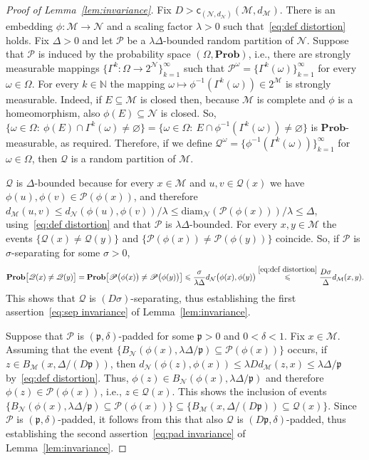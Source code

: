 \documentclass[11pt,reqno]{amsart}
\renewcommand{\le}{\leqslant}
\newcommand{\diam}{\mathrm{diam}}
\renewcommand{\d}{\delta}
\newcommand{\cc}{\mathsf{c}}
\newcommand{\NN}{\mathcal{N}}
\theoremstyle{remark}
\newcommand{\MM}{\mathcal{M}}
\renewcommand{\subset}{\subseteq}
\newcommand{\N}{\mathbb N}
\renewcommand{\Pr}{\mathbf{Prob}}
\renewcommand{\emptyset}{\varnothing}
\renewcommand{\1}{\mathbf 1}
\newcommand{\Part}{\mathscr{P}}
\begin{document}
\begin{proof}[Proof of Lemma~\ref{lem:invariance}]
Fix $D>\cc_{(\NN,d_\NN)}(\MM,d_\MM)$. There is an embedding $\phi:\MM\to \NN$ and a scaling factor $\lambda>0$ such that~\eqref{eq:def distortion} holds.  Fix $\Delta>0$ and let $\Part$ be a $\lambda\Delta$-bounded random partition of $\NN$. Suppose that $\Part$ is induced by the probability space $(\Omega,\Pr)$, i.e., there are strongly measurable  mappings $\{\Gamma^k:\Omega\to 2^\NN\}_{k=1}^\infty$ such that $\Part^\omega=\{\Gamma^k(\omega)\}_{k=1}^\infty$ for every $\omega\in \Omega$. For every $k\in \N$ the mapping $\omega\mapsto \phi^{-1}(\Gamma^k(\omega))\in 2^\MM$ is strongly measurable. Indeed, if $E\subset \MM$ is closed then, because $\MM$ is complete and $\phi$ is a homeomorphism, also $\phi(E)\subset \NN$ is closed. So, $\{\omega\in \Omega:\ \phi(E)\cap \Gamma^k(\omega)\neq\emptyset\}=\{\omega\in \Omega:\ E\cap \phi^{-1}(\Gamma^k(\omega))\neq\emptyset\}$ is $\Pr$-measurable, as required. Therefore, if we define $\mathscr{Q}^\omega =\{\phi^{-1}(\Gamma^k(\omega))\}_{k=1}^\infty$ for $\omega\in \Omega$, then $\mathscr{Q}$ is a random partition of $\MM$.

$\mathscr{Q}$ is $\Delta$-bounded because for every  $x\in \MM$ and $u,v\in \mathscr{Q}(x)$ we have $\phi(u),\phi(v)\in \Part(\phi(x))$, and therefore $d_\MM(u,v)\le d_\NN(\phi(u),\phi(v))/\lambda\le \diam_\NN(\Part(\phi(x)))/\lambda\le \Delta$, using~\eqref{eq:def distortion}  and  that $\Part$ is $\lambda\Delta$-bounded. For every $x,y\in \MM$ the events $\{\mathscr{Q}(x)\neq \mathscr{Q}(y)\}$ and $\{\Part(\phi(x))\neq \Part(\phi(y))\}$ coincide. So, if  $\Part$ is $\sigma$-separating for some $\sigma>0$,
 $$
 \Pr\big[\mathscr{Q}(x)\neq \mathscr{Q}(y)\big]=\Pr\big[\Part\big(\phi(x)\big)\neq \Part\big(\phi(y)\big)\big]\le \frac{\sigma}{\lambda\Delta}d_\NN\big(\phi(x),\phi(y)\big)\stackrel{\eqref{eq:def distortion}}{\le} \frac{D\sigma}{\Delta}d_\MM(x,y).
 $$
 This shows that $\mathscr{Q}$ is $(D\sigma)$-separating, thus establishing the first assertion~\eqref{eq:sep invariance} of Lemma~\ref{lem:invariance}.

Suppose that $\Part$ is $(\mathfrak{p},\d)$-padded for some  $\mathfrak{p}>0$ and $0<\d<1$. Fix $x\in \MM$. Assuming that the event $\{B_\NN(\phi(x),\lambda\Delta/\mathfrak{p})\subset \Part(\phi(x))\}$ occurs, if $z\in B_\MM(x,\Delta/(D\mathfrak{p}))$, then $d_\NN(\phi(z),\phi(x))\le \lambda D d_\MM(z,x)\le \lambda\Delta/\mathfrak{p}$ by~\eqref{eq:def distortion}. Thus, $\phi(z)\in  B_\NN(\phi(x),\lambda\Delta/\mathfrak{p})$ and therefore  $\phi(z)\in \Part(\phi(x))$, i.e., $z\in \mathscr{Q}(x)$. This shows the inclusion of events  $\{B_\NN(\phi(x),\lambda\Delta/\mathfrak{p})\subset \Part(\phi(x))\}\subset \{B_\MM(x,\Delta/(D\mathfrak{p}))\subset \mathscr{Q}(x)\}$. Since $\Part$ is $(\mathfrak{p},\d)$-padded, it follows from this that also $\mathscr{Q}$ is $(D\mathfrak{p},\d)$-padded, thus establishing the second assertion~\eqref{eq:pad invariance} of Lemma~\ref{lem:invariance}.
\end{proof}
\end{document}

